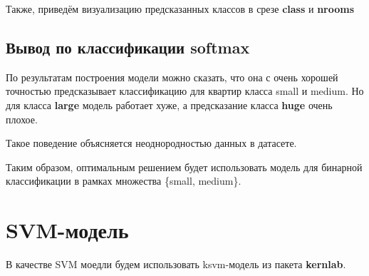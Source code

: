 Также, приведём визуализацию предсказанных классов в срезе \textbf{class} и \textbf{nrooms}


\subsection{Вывод по классификации softmax}

По результатам построения модели можно сказать, что она с очень хорошей точностью предсказывает классификацию для квартир класса small и medium. Но для класса \textbf{large} модель работает хуже, а предсказание класса \textbf{huge} очень плохое. 

Такое поведение объясняется неоднородностью данных в датасете. 

Таким образом, оптимальным решением будет использовать модель для бинарной классификации в рамках множества \{small, medium\}.

\section{SVM-модель}

В качестве SVM моедли будем использовать ksvm-модель из пакета \textbf{kernlab}.





